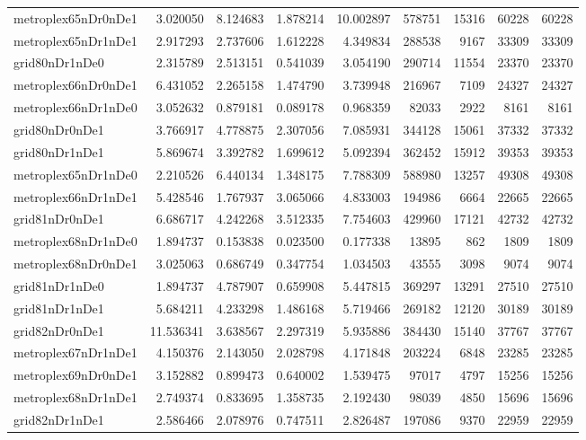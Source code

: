 \begin{longtable}{|l|r|r|r|r|r|r|r|r|}
metroplex65nDr0nDe1 & 3.020050 & 8.124683 & 1.878214 & 10.002897 & 578751 & 15316 & 60228 & 60228 \\
metroplex65nDr1nDe1 & 2.917293 & 2.737606 & 1.612228 & 4.349834 & 288538 & 9167 & 33309 & 33309 \\
grid80nDr1nDe0 & 2.315789 & 2.513151 & 0.541039 & 3.054190 & 290714 & 11554 & 23370 & 23370 \\
metroplex66nDr0nDe1 & 6.431052 & 2.265158 & 1.474790 & 3.739948 & 216967 & 7109 & 24327 & 24327 \\
metroplex66nDr1nDe0 & 3.052632 & 0.879181 & 0.089178 & 0.968359 & 82033 & 2922 & 8161 & 8161 \\
grid80nDr0nDe1 & 3.766917 & 4.778875 & 2.307056 & 7.085931 & 344128 & 15061 & 37332 & 37332 \\
grid80nDr1nDe1 & 5.869674 & 3.392782 & 1.699612 & 5.092394 & 362452 & 15912 & 39353 & 39353 \\
metroplex65nDr1nDe0 & 2.210526 & 6.440134 & 1.348175 & 7.788309 & 588980 & 13257 & 49308 & 49308 \\
metroplex66nDr1nDe1 & 5.428546 & 1.767937 & 3.065066 & 4.833003 & 194986 & 6664 & 22665 & 22665 \\
grid81nDr0nDe1 & 6.686717 & 4.242268 & 3.512335 & 7.754603 & 429960 & 17121 & 42732 & 42732 \\
metroplex68nDr1nDe0 & 1.894737 & 0.153838 & 0.023500 & 0.177338 & 13895 & 862 & 1809 & 1809 \\
metroplex68nDr0nDe1 & 3.025063 & 0.686749 & 0.347754 & 1.034503 & 43555 & 3098 & 9074 & 9074 \\
grid81nDr1nDe0 & 1.894737 & 4.787907 & 0.659908 & 5.447815 & 369297 & 13291 & 27510 & 27510 \\
grid81nDr1nDe1 & 5.684211 & 4.233298 & 1.486168 & 5.719466 & 269182 & 12120 & 30189 & 30189 \\
grid82nDr0nDe1 & 11.536341 & 3.638567 & 2.297319 & 5.935886 & 384430 & 15140 & 37767 & 37767 \\
metroplex67nDr1nDe1 & 4.150376 & 2.143050 & 2.028798 & 4.171848 & 203224 & 6848 & 23285 & 23285 \\
metroplex69nDr0nDe1 & 3.152882 & 0.899473 & 0.640002 & 1.539475 & 97017 & 4797 & 15256 & 15256 \\
metroplex68nDr1nDe1 & 2.749374 & 0.833695 & 1.358735 & 2.192430 & 98039 & 4850 & 15696 & 15696 \\
grid82nDr1nDe1 & 2.586466 & 2.078976 & 0.747511 & 2.826487 & 197086 & 9370 & 22959 & 22959 \\

\end{longtable}
